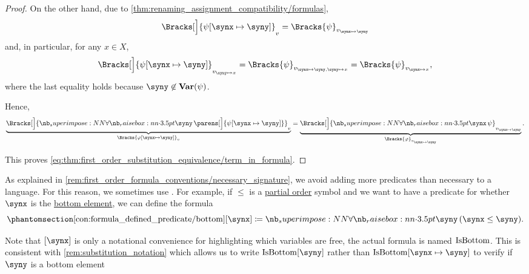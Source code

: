 \begin{proof}
  On the other hand, due to \cref{thm:renaming_assignment_compatibility/formulas},
  \begin{equation*}
    \Bracks[\Big]{ \psi[\synx \mapsto \syny] }_v = \Bracks{\psi}_{v_{\synx \mapsto \syny}}
  \end{equation*}
  and, in particular, for any \( x \in X \),
  \begin{equation*}
    \Bracks[\Big]{ \psi[\synx \mapsto \syny] }_{v_{\syny \mapsto x}}
    =
    \Bracks{\psi}_{v_{\synx \mapsto \syny,\syny \mapsto x}}
    =
    \Bracks{\psi}_{v_{\synx \mapsto x}},
  \end{equation*}
  where the last equality holds because \( \syny \not\in \op*{Var}(\psi) \).

  Hence,
  \begin{equation*}
    \underbrace{ \Bracks[\Big]{\qforall \syny \parens[\Big]{ \psi[\synx \mapsto \syny] } }_v }_{\Bracks{\varphi[\synx \mapsto \syny]}_v}
    =
    \underbrace{ \Bracks[\Big]{\qforall \synx \psi }_{v_{\synx \mapsto \syny}} }_{\Bracks{\varphi}_{v_{\synx \mapsto \syny}}}.
  \end{equation*}

  This proves \eqref{eq:thm:first_order_substitution_equivalence/term_in_formula}.
\end{proof}

\begin{concept}\label{con:formula_defined_predicate}
  As explained in \cref{rem:first_order_formula_conventions/necessary_signature}, we avoid adding more predicates than necessary to a language. For this reason, we sometimes use . For example, if \( \leq \) is a \hyperref[def:partially_ordered_set]{partial order} symbol and we want to have a predicate for whether \( \synx \) is the \hyperref[def:extremal_points/top_and_bottom]{bottom element}, we can define the formula
  \begin{equation}\taglabel[\op{IsBottom}]{con:formula_defined_predicate/bottom}
    \ref{con:formula_defined_predicate/bottom}[\synx] \coloneqq \qforall \syny (\synx \leq \syny).
  \end{equation}

  Note that \( [\synx] \) is only a notational convenience for highlighting which variables are free, the actual formula is named \( \op{IsBottom} \). This is consistent with \cref{rem:substitution_notation} which allows us to write \( \op{IsBottom}[\syny] \) rather than \( \op{IsBottom}[\synx \mapsto \syny] \) to verify if \( \syny \) is a bottom element
\end{concept}

